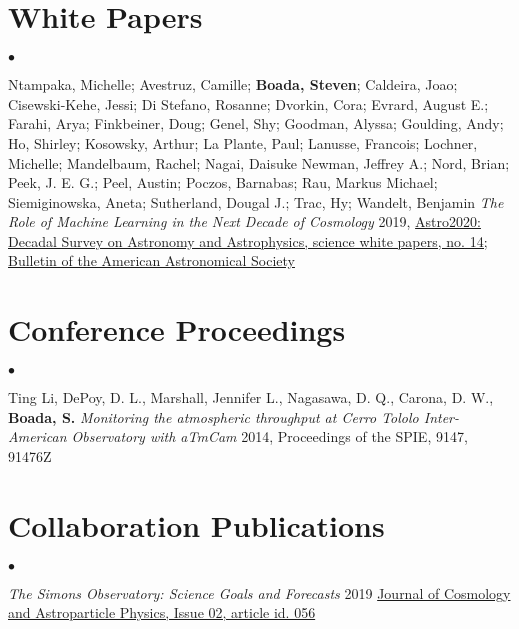 \documentclass[margin,line, 11pt]{res}
\newenvironment{list2}{
  \begin{list}{$\bullet$}{%
      \setlength{\itemsep}{0in}
      \setlength{\parsep}{0in} \setlength{\parskip}{0in}
      \setlength{\topsep}{0in} \setlength{\partopsep}{0in}
      \setlength{\leftmargin}{0.2in}}}{\end{list}}
\begin{document}
\begin{resume}
\section{White Papers}
\begin{list2}
  \item  Ntampaka, Michelle; Avestruz, Camille; \textbf{Boada, Steven}; Caldeira, Joao; Cisewski-Kehe, Jessi; Di Stefano, Rosanne; Dvorkin, Cora; Evrard, August E.; Farahi, Arya; Finkbeiner, Doug; Genel, Shy; Goodman, Alyssa; Goulding, Andy; Ho, Shirley; Kosowsky, Arthur; La Plante, Paul; Lanusse, Francois; Lochner, Michelle; Mandelbaum, Rachel; Nagai, Daisuke Newman, Jeffrey A.; Nord, Brian; Peek, J. E. G.; Peel, Austin; Poczos, Barnabas; Rau, Markus Michael; Siemiginowska, Aneta; Sutherland, Dougal J.; Trac, Hy; Wandelt, Benjamin  \emph{The Role of Machine Learning in the Next Decade of Cosmology} 2019, \href{https://ui.adsabs.harvard.edu/abs/2019BAAS...51c..14N/abstract}{Astro2020: Decadal Survey on Astronomy and Astrophysics, science white papers, no. 14; Bulletin of the American Astronomical Society}
\end{list2}

\section{Conference Proceedings}
\begin{list2}
\item Ting Li, DePoy, D. L., Marshall, Jennifer L., Nagasawa, D. Q., Carona, D. W., {\bf Boada, S.} \emph{Monitoring the atmospheric throughput at Cerro Tololo Inter-American Observatory with aTmCam} 2014, Proceedings of the SPIE, 9147, 91476Z
\end{list2}

\section{Collaboration Publications}
\begin{list2}
  \item \emph{The Simons Observatory: Science Goals and Forecasts} 2019 \href{https://ui.adsabs.harvard.edu/abs/2019JCAP...02..056A/abstract}{Journal of Cosmology and Astroparticle Physics, Issue 02, article id. 056}
\end{list2}

\end{resume}
\end{document}
